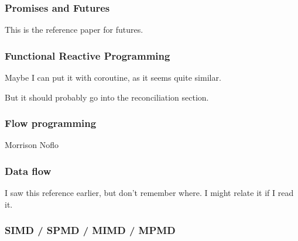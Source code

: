 






\subsubsection{Promises and Futures}

This \cite{Jr1977} is the reference paper for futures.

\subsubsection{Functional Reactive Programming}

Maybe I can put it with coroutine, as it seems quite similar.

But it should probably go into the reconciliation section.

\subsubsection{Flow programming}
Morrison
Noflo

\subsubsection{Data flow}

I saw this reference earlier, but don't remember where. \cite{Kahn1974}
I might relate it if I read it.

\subsubsection{SIMD / SPMD / MIMD / MPMD}

